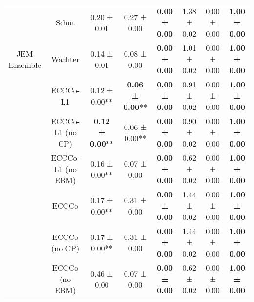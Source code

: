 \begin{table}
{\begin{tabular}[t]{cccccccc}
 & Schut & 0.20 ± 0.01\hphantom{*}\hphantom{*} & 0.27 ± 0.00\hphantom{*}\hphantom{*} & \textbf{0.00 ± 0.00}\hphantom{*}\hphantom{*} & 1.38 ± 0.02\hphantom{*}\hphantom{*} & 0.00 ± 0.00\hphantom{*}\hphantom{*} & \textbf{1.00 ± 0.00}\hphantom{*}\hphantom{*}\\

\multirow[t]{-9}{*}{\centering\arraybackslash JEM Ensemble} & Wachter & 0.14 ± 0.01\hphantom{*}\hphantom{*} & 0.08 ± 0.00\hphantom{*}\hphantom{*} & \textbf{0.00 ± 0.00}\hphantom{*}\hphantom{*} & 1.01 ± 0.02\hphantom{*}\hphantom{*} & 0.00 ± 0.00\hphantom{*}\hphantom{*} & \textbf{1.00 ± 0.00}\hphantom{*}\hphantom{*}\\
\cmidrule{1-8}
 & ECCCo-L1 & 0.12 ± 0.00** & \textbf{0.06 ± 0.00}** & \textbf{0.00 ± 0.00}\hphantom{*}\hphantom{*} & 0.91 ± 0.02\hphantom{*}\hphantom{*} & 0.00 ± 0.00\hphantom{*}\hphantom{*} & \textbf{1.00 ± 0.00}\hphantom{*}\hphantom{*}\\

 & ECCCo-L1 (no CP) & \textbf{0.12 ± 0.00}** & 0.06 ± 0.00** & \textbf{0.00 ± 0.00}\hphantom{*}\hphantom{*} & 0.90 ± 0.02\hphantom{*}\hphantom{*} & 0.00 ± 0.00\hphantom{*}\hphantom{*} & \textbf{1.00 ± 0.00}\hphantom{*}\hphantom{*}\\

 & ECCCo-L1 (no EBM) & 0.16 ± 0.00** & 0.07 ± 0.00\hphantom{*}\hphantom{*} & \textbf{0.00 ± 0.00}\hphantom{*}\hphantom{*} & 0.62 ± 0.02\hphantom{*}\hphantom{*} & 0.00 ± 0.00\hphantom{*}\hphantom{*} & \textbf{1.00 ± 0.00}\hphantom{*}\hphantom{*}\\

 & ECCCo & 0.17 ± 0.00** & 0.31 ± 0.00\hphantom{*}\hphantom{*} & \textbf{0.00 ± 0.00}\hphantom{*}\hphantom{*} & 1.44 ± 0.02\hphantom{*}\hphantom{*} & 0.00 ± 0.00\hphantom{*}\hphantom{*} & \textbf{1.00 ± 0.00}\hphantom{*}\hphantom{*}\\

 & ECCCo (no CP) & 0.17 ± 0.00** & 0.31 ± 0.00\hphantom{*}\hphantom{*} & \textbf{0.00 ± 0.00}\hphantom{*}\hphantom{*} & 1.44 ± 0.02\hphantom{*}\hphantom{*} & 0.00 ± 0.00\hphantom{*}\hphantom{*} & \textbf{1.00 ± 0.00}\hphantom{*}\hphantom{*}\\

 & ECCCo (no EBM) & 0.46 ± 0.00\hphantom{*}\hphantom{*} & 0.07 ± 0.00\hphantom{*}\hphantom{*} & \textbf{0.00 ± 0.00}\hphantom{*}\hphantom{*} & 0.62 ± 0.02\hphantom{*}\hphantom{*} & 0.00 ± 0.00\hphantom{*}\hphantom{*} & \textbf{1.00 ± 0.00}\hphantom{*}\hphantom{*}\\


\end{tabular}}
\end{table}
